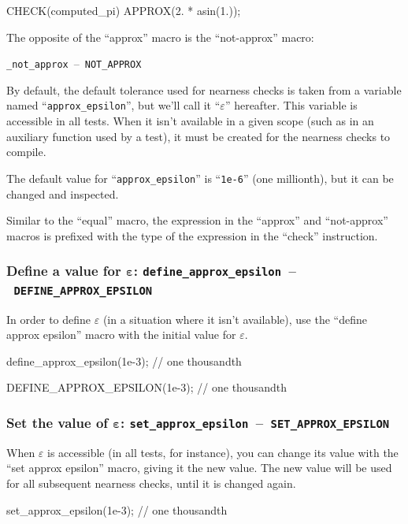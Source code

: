 \documentclass[twoside, a4paper, article]{memoir}
\newcommand*\testudocolor{\color{red!80!blue}}
\newcommand*\testudo[1]{\texttt{\testudocolor{}#1}}
\newcommand*\testudopair[2]{\testudo{#1}~--~\testudo{#2}}
\newcommand\subsubsectiontestudopair[3]{%
  \subsubsection[#1]{#1: \testudopair{#2}{#3}}}
\begin{document}
\begin{cpplisting}
CHECK(computed_pi) APPROX(2. * asin(1.));
\end{cpplisting}

The opposite of the ``approx'' macro is the ``not-approx'' macro:
\begin{center}
  \testudopair{\_not\_approx}{NOT\_APPROX}
\end{center}

By default, the default tolerance used for nearness checks is taken from a
variable named ``\texttt{approx\_epsilon}'', but we'll call it
``$\varepsilon$'' hereafter.  This variable is accessible in all tests.  When
it isn't available in a given scope (such as in an auxiliary function used by a
test), it must be created for the nearness checks to compile.

The default value for ``\texttt{approx\_epsilon}'' is ``\texttt{1e-6}'' (one
millionth), but it can be changed and inspected.

Similar to the ``equal'' macro, the expression in the ``approx'' and
``not-approx'' macros is prefixed with the type of the expression in the
``check'' instruction.

\subsubsectiontestudopair{Define a value for $\bm{\varepsilon}$}%
  {define\_approx\_epsilon}{DEFINE\_APPROX\_EPSILON}
\label{sec:define-value-epsilon}

In order to define $\varepsilon$ (in a situation where it isn't available), use
the ``define approx epsilon'' macro with the initial value for $\varepsilon$.

\begin{cpplisting}
define_approx_epsilon(1e-3); // one thousandth
\end{cpplisting}

\begin{cpplisting}
DEFINE_APPROX_EPSILON(1e-3); // one thousandth
\end{cpplisting}

\subsubsectiontestudopair{Set the value of $\bm{\varepsilon}$}%
  {set\_approx\_epsilon}{SET\_APPROX\_EPSILON}
\label{sec:set-value-epsilon}

When $\varepsilon$ is accessible (in all tests, for instance), you can change
its value with the ``set approx epsilon'' macro, giving it the new value.  The
new value will be used for all subsequent nearness checks, until it is changed
again.

\begin{cpplisting}
set_approx_epsilon(1e-3); // one thousandth
\end{cpplisting}
\end{document}
